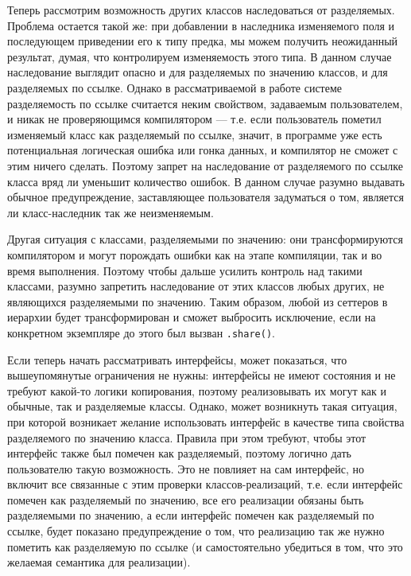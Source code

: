 \documentclass[specification,annotation,times]{itmo-student-thesis}
\begin{document}
Теперь рассмотрим возможность других классов наследоваться от разделяемых.
Проблема остается такой же: при добавлении в наследника изменяемого поля и последующем приведении его к типу предка, мы можем получить неожиданный результат, думая, что контролируем изменяемость этого типа.
 В данном случае наследование выглядит опасно и для разделяемых по значению классов, и для разделяемых по ссылке.
 Однако в рассматриваемой в работе системе разделяемость по ссылке считается неким свойством, задаваемым пользователем, и никак не проверяющимся компилятором --- т.е. если пользователь пометил изменяемый класс как разделяемый по ссылке, значит, в программе уже есть потенциальная логическая ошибка или гонка данных, и компилятор не сможет с этим ничего сделать.
 Поэтому запрет на наследование от разделяемого по ссылке класса вряд ли уменьшит количество ошибок. В данном случае разумно выдавать обычное предупреждение, заставляющее пользователя задуматься о том, является ли класс-наследник так же неизменяемым.
 
 Другая ситуация с классами, разделяемыми по значению: они трансформируются компилятором и могут порождать ошибки как на этапе компиляции, так и во время выполнения.
 Поэтому чтобы дальше усилить контроль над такими классами, разумно запретить наследование от этих классов любых других, не являющихся разделяемыми по значению. Таким образом, любой из сеттеров в иерархии будет трансформирован и сможет выбросить исключение, если на конкретном экземпляре до этого был вызван \texttt{.share()}.
 
 Если теперь начать рассматривать интерфейсы, может показаться, что вышеупомянутые ограничения не нужны: интерфейсы не имеют состояния и не требуют какой-то логики копирования, поэтому реализовывать их могут как и обычные, так и разделяемые классы.
 Однако, может возникнуть такая ситуация, при которой возникает желание использовать интерфейс в качестве типа свойства разделяемого по значению класса.
 Правила при этом требуют, чтобы этот интерфейс также был помечен как разделяемый, поэтому логично дать пользователю такую возможность.
 Это не повлияет на сам интерфейс, но включит все связанные с этим проверки классов-реализаций, т.е. если интерфейс помечен как разделяемый по значению, все его реализации обязаны быть разделяемыми по значению, а если интерфейс помечен как разделяемый по ссылке, будет показано предупреждение о том, что реализацию так же нужно пометить как разделяемую по ссылке (и самостоятельно убедиться в том, что это желаемая семантика для реализации).
\end{document}
